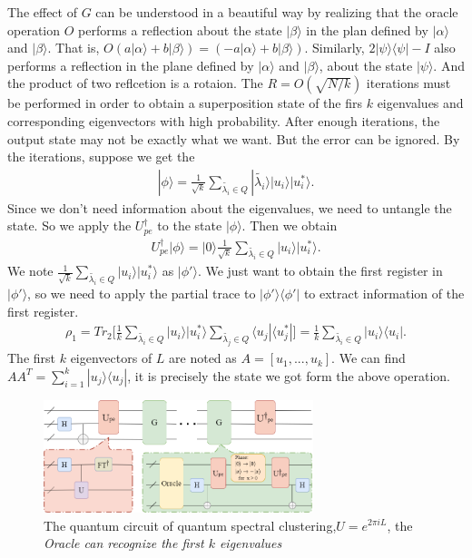 \documentclass[onecolumn,notitlepage]{revtex4-1}
\def\ket#1{| #1 \rangle}
\def\bra#1{\langle #1 |}
\begin{document}
The effect of $G$ can be understood in a beautiful way by realizing that the oracle operation $O$ performs a reflection about the state $\ket{\beta}$ in the plan defined by $\ket{\alpha}$ and $\ket{\beta}$.
That is, $O(a\ket{\alpha}+b\ket{\beta})=(-a\ket{\alpha}+b\ket{\beta})$.
Similarly, $2\ket{\psi}\bra{\psi}-I$ also performs a reflection in the plane defined by $\ket{\alpha}$ and $\ket{\beta}$, about the state $\ket{\psi}$. And the product of two reflcetion is a rotaion. The $R=O(\sqrt{N/k})$ iterations must be performed in order to obtain a superposition state of the firs $k$ eigenvalues and corresponding eigenvectors with high probability. After enough iterations, the output state may not be exactly what we want. But the error can be ignored. By the iterations, suppose we get the
\begin{align}
    \ket{\phi}=\frac{1}{\sqrt{k}}\sum_{\tilde{\lambda_{i}}\in Q}\ket{\tilde{\lambda_{i}}}\ket{u_{i}}\ket{u_{i}^{*}}.
\end{align}
Since we don't need information about the eigenvalues, we need to untangle the state. So we apply the $U_{pe}^{\dagger}$ to the state $\ket{\phi}$. Then we obtain
\begin{align}
    U_{pe}^{\dagger}\ket{\phi}=\ket{0}\frac{1}{\sqrt{k}}\sum_{\tilde{\lambda_{i}}\in Q}\ket{u_{i}}\ket{u_{i}^{*}}.
\end{align}
We note $\frac{1}{\sqrt{k}}\sum_{\tilde{\lambda_{i}}\in Q}\ket{u_{i}}\ket{u_{i}^{*}}$ as $\ket{\phi'}$. We just want to obtain the first register in $\ket{\phi'}$, so we need to apply the partial trace to $\ket{\phi'}\bra{\phi'}$ to extract information of the first register.
\begin{align}
    \rho_{1}=Tr_{2}\bigg[\frac{1}{k}\sum_{\tilde{\lambda_{i}}\in Q}\ket{u_{i}}\ket{u_{i}^{*}}\sum_{\tilde{\lambda_{j}}\in Q}\bra{u_{j}}\bra{u_{j}^{*}} \bigg]=\frac{1}{k}\sum_{\tilde{\lambda_{i}}\in Q}\ket{u_{i}}\bra{u_{i}}.
\end{align}
The first $k$ eigenvectors of $L$ are noted as $A=[u_{1},...,u_{k}]$. We can find $AA^{T}=\sum_{i=1}^{k}\ket{u_{j}}\bra{u_{j}}$, it is precisely the state we got form the above operation.

\begin{figure}[H] %
    \centering %
    \includegraphics[width=0.7\textwidth]{image//circuit.png} %
    \caption{The quantum circuit of quantum spectral clustering,$U=e^{2\pi iL}$, the \em{Oracle} can recognize the first $k$ eigenvalues} %
    \label{Fig.main2} %
\end{figure}
\end{document}
